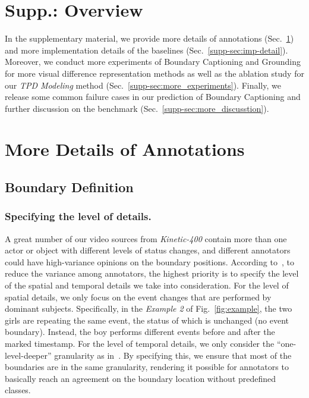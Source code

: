 \documentclass[runningheads]{llncs}
\begin{document}
\clearpage



\section*{Supp.: Overview}

In the supplementary material, we provide 
more details of annotations (Sec.~\ref{supp-sec:anno}) and more implementation details of the baselines (Sec.~\ref{supp-sec:imp-detail}). Moreover, we conduct more experiments of Boundary Captioning and Grounding for more visual difference representation methods as well as the ablation study for our \textit{TPD Modeling} method (Sec.~\ref{supp-sec:more_experiments}). Finally, we release some common failure cases in our prediction of Boundary Captioning and further discussion on the benchmark (Sec.~\ref{supp-sec:more_discusstion}).

\section{More Details of Annotations}
\label{supp-sec:anno}


\subsection{Boundary Definition}

\subsubsection{Specifying the level of details.}
A great number of our video sources from \textit{Kinetic-400} contain more than one actor or object with different levels of status changes, and different annotators could have high-variance opinions on the boundary positions. According to~\cite{shou2021generic}, to reduce the variance among annotators, the highest priority is to specify the level of the spatial and temporal details we take into consideration. For the level of spatial details, we only focus on the event changes that are performed by dominant subjects. Specifically, in the \textit{Example 2} of Fig.~\ref{fig:example}, the two girls are repeating the same event, the status of which is unchanged (no event boundary). Instead, the boy performs different events before and after the marked timestamp. For the level of temporal details, we only consider the “one-level-deeper” granularity as in~\cite{shou2021generic}. By specifying this, we ensure that most of the boundaries are in the same granularity, rendering it possible for annotators to basically reach an agreement on the boundary location without predefined classes.
\end{document}
